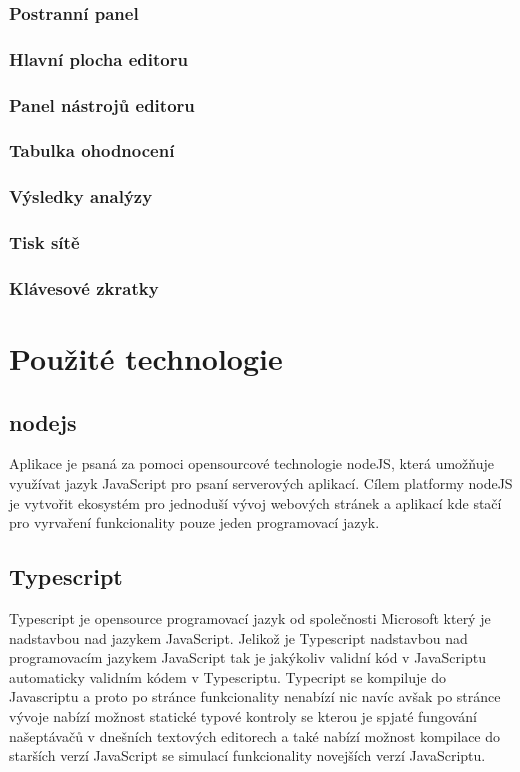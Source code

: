 \documentclass[
  biblatex,
  glossaries,
  index
]{kidiplom}
\begin{document}
\subsubsection{Postranní panel}
\subsubsection{Hlavní plocha editoru}
\subsubsection{Panel nástrojů editoru}
\subsubsection{Tabulka ohodnocení}
\subsubsection{Výsledky analýzy}
\subsubsection{Tisk sítě}

\subsubsection{Klávesové zkratky}





\section{Použité technologie}

\subsection{nodejs}
Aplikace je psaná za pomoci opensourcové technologie nodeJS, která umožňuje využívat jazyk
JavaScript pro psaní serverových aplikací. Cílem platformy nodeJS je vytvořit
ekosystém pro jednoduší vývoj webových stránek a aplikací kde stačí pro vyrvaření
funkcionality pouze jeden programovací jazyk.

\subsection{Typescript}
Typescript je opensource programovací jazyk od společnosti Microsoft který je nadstavbou nad jazykem JavaScript.
Jelikož je Typescript nadstavbou nad programovacím jazykem JavaScript tak je jakýkoliv validní kód v JavaScriptu automaticky validním kódem v Typescriptu.
Typecript se kompiluje do Javascriptu a proto po stránce funkcionality nenabízí nic navíc avšak po stránce vývoje nabízí možnost statické typové kontroly
se kterou je spjaté fungování našeptávačů v dnešních textových editorech a také nabízí možnost kompilace do starších verzí JavaScript se simulací funkcionality novejších verzí JavaScriptu.
\end{document}
